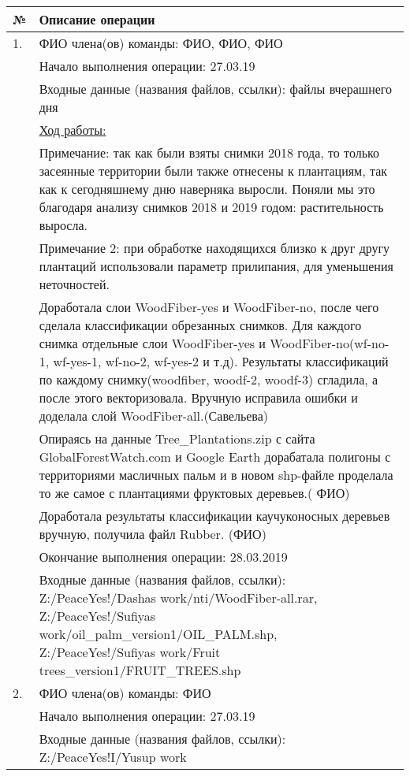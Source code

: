 \begin{center}
    \begin{longtable}{|l|p{14.5cm}|}
        \hline
        № & Описание операции \\
        \hline
        1. & ФИО члена(ов) команды: ФИО, ФИО, ФИО \\
           & Начало выполнения операции: 27.03.19 \\
           & Входные данные (названия файлов, ссылки): файлы вчерашнего дня \\
           & \underline{Ход работы:} \\
           & Примечание: так как были взяты снимки 2018 года, то только засеянные территории были также отнесены к плантациям, так как к сегодняшнему дню наверняка выросли. Поняли мы это благодаря анализу снимков 2018 и 2019 годом: растительность выросла. \\
           & Примечание 2: при обработке находящихся близко к друг другу плантаций использовали параметр прилипания, для уменьшения неточностей. \\
           & Доработала слои WoodFiber-yes и WoodFiber-no, после чего сделала классификации обрезанных снимков. Для каждого снимка отдельные слои WoodFiber-yes и WoodFiber-no(wf-no-1, wf-yes-1, wf-no-2, wf-yes-2 и т.д). Результаты классификаций по каждому снимку(woodfiber, woodf-2, woodf-3) сгладила, а после этого векторизовала. Вручную исправила ошибки и доделала слой WoodFiber-all.(Савельева) \\
           & Опираясь на данные Tree\_Plantations.zip с сайта GlobalForestWatch.com и Google Earth дорабатала полигоны с территориями масличных пальм и в новом shp-файле проделала то же самое с плантациями фруктовых деревьев.( ФИО)\\
           & Доработала результаты классификации каучуконосных деревьев вручную, получила файл Rubber. (ФИО) \\
           & Окончание выполнения операции: 28.03.2019 \\
           & Входные данные (названия файлов, ссылки): Z:/PeaceYes!/Dashas work/nti/WoodFiber-all.rar, Z:/PeaceYes!/Sufiyas work/oil\_palm\_version1/OIL\_PALM.shp, Z:/PeaceYes!/Sufiyas work/Fruit trees\_version1/FRUIT\_TREES.shp \\
        \hline
        2. & ФИО члена(ов) команды: ФИО \\
           & Начало выполнения операции: 27.03.19 \\
           & Входные данные (названия файлов, ссылки): Z:/PeaceYes!I/Yusup work \\

\end{longtable}
\end{center}
